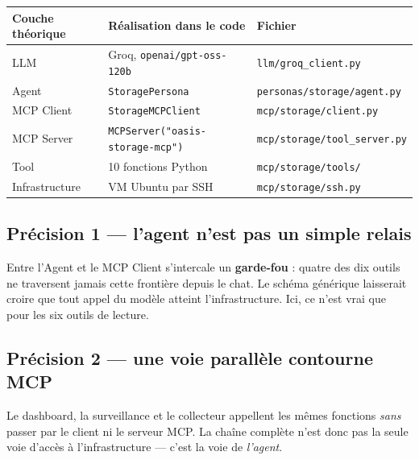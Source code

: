 \documentclass[11pt,a4paper]{report}
\newcommand{\file}[1]{\texttt{\small #1}}
\newcommand{\cls}[1]{\texttt{\small\textcolor{oasisblue}{#1}}}
\begin{document}
\begin{longtable}{@{}p{3.4cm}p{4.6cm}p{6.6cm}@{}}
\toprule
\textbf{Couche théorique} & \textbf{Réalisation dans le code} & \textbf{Fichier}\\
\midrule
\endhead
LLM & Groq, \texttt{openai/gpt-oss-120b} & \file{llm/groq\_client.py}\\
Agent & \cls{StoragePersona} & \file{personas/storage/agent.py}\\
MCP Client & \cls{StorageMCPClient} & \file{mcp/storage/client.py}\\
MCP Server & \cls{MCPServer("oasis-storage-mcp")} & \file{mcp/storage/tool\_server.py}\\
Tool & 10 fonctions Python & \file{mcp/storage/tools/}\\
Infrastructure & VM Ubuntu par SSH & \file{mcp/storage/ssh.py}\\
\bottomrule
\end{longtable}

\subsection*{Précision 1 --- l'agent n'est pas un simple relais}
Entre l'Agent et le MCP Client s'intercale un \textbf{garde-fou} : quatre des
dix outils ne traversent jamais cette frontière depuis le chat. Le schéma
générique laisserait croire que tout appel du modèle atteint l'infrastructure.
Ici, ce n'est vrai que pour les six outils de lecture.

\subsection*{Précision 2 --- une voie parallèle contourne MCP}
Le dashboard, la surveillance et le collecteur appellent les mêmes fonctions
\emph{sans} passer par le client ni le serveur MCP. La chaîne complète n'est
donc pas la seule voie d'accès à l'infrastructure --- c'est la voie de
\emph{l'agent}.
\end{document}
